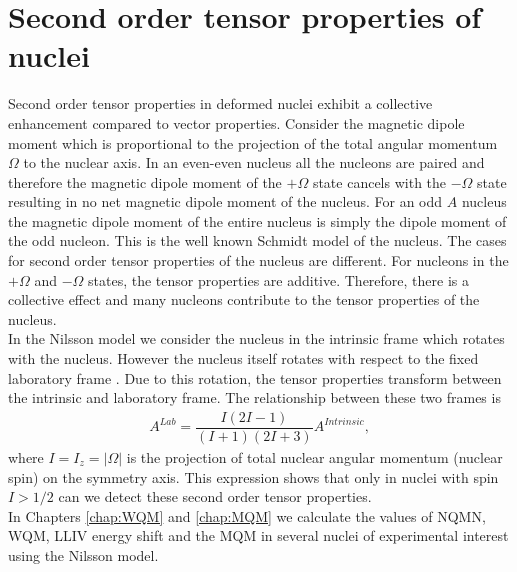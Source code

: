 \documentclass[10pt,a4paper, twoside, openright]{report}
\begin{document}
\section{Second order tensor properties of nuclei}
Second order tensor properties  in deformed nuclei exhibit a collective enhancement compared to vector properties. Consider the magnetic dipole moment  which is proportional to  the projection of the total angular momentum $\Omega$ to the nuclear axis. In an even-even nucleus all the nucleons are paired and therefore the magnetic dipole moment of the $+\Omega$ state cancels with the $-\Omega$ state resulting in no net magnetic dipole moment of the nucleus. For an odd $A$ nucleus  the magnetic dipole moment of the entire nucleus is simply the dipole moment of the odd nucleon. This is the well known Schmidt model of the nucleus. The cases for second order tensor properties of the nucleus are different. For nucleons in the  $+\Omega$ and $-\Omega$ states, the tensor properties  are additive. Therefore, there is a collective effect and many nucleons contribute to the tensor properties of the nucleus.\\
\linebreak
In the Nilsson model we consider the nucleus in the intrinsic frame which rotates with the nucleus. However the nucleus itself rotates with respect to the fixed laboratory frame \cite{BohrMottVol2}. Due to this rotation, the tensor properties transform between the intrinsic  and laboratory frame. The relationship between these two frames is \cite{BohrMottVol2}
\begin{align} \label{eq:RotationalFactor}
A^{Lab} = \dfrac{I\left(2I - 1\right)}{\left(I + 1 \right)\left(2I + 3\right)}A^{Intrinsic},
\end{align}
where $I=I_z= \left|\Omega\right|$ is the projection of total nuclear angular momentum (nuclear spin) on the symmetry axis. This expression shows that only in nuclei with spin $I > 1/2$ can we detect these second order tensor properties. \\
\linebreak
In Chapters \ref{chap:WQM} and \ref{chap:MQM} we calculate the values of NQMN, WQM, LLIV energy shift and the MQM in several nuclei of experimental interest using the Nilsson model.
\end{document}
